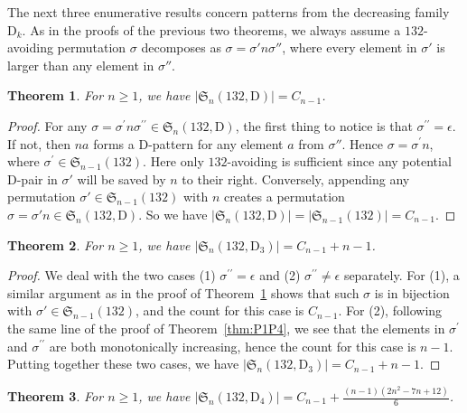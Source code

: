 \documentclass[12pt,reqno]{article}
\numberwithin{equation}{section}
\theoremstyle{plain}
\newtheorem{theorem}{Theorem}[section]
\theoremstyle{definition}
\def\fS{\mathfrak{S}}
\def\rD{\mathrm{D}}
\begin{document}
The next three enumerative results concern patterns from the decreasing family $\rD_k$. As in the proofs of the previous two theorems, we always assume a $132$-avoiding permutation $\sigma$ decomposes as $\sigma=\sigma'n\sigma''$, where every element in $\sigma'$ is larger than any element in $\sigma''$.

\begin{theorem}\label{thm:132D}
	For $n\geq 1$, we have $|\fS_n(132, \rD)|=C_{n-1}$. 
\end{theorem}

\begin{proof}
	For any $\sigma=\sigma^{\prime}n\sigma^{\prime \prime}\in \fS_n(132, \rD)$, the first thing to notice is that $\sigma^{\prime \prime}=\epsilon$. If not, then $na$ forms a $\rD$-pattern for any element $a$ from $\sigma''$. Hence $\sigma=\sigma^{\prime}n$, where $\sigma^{\prime}\in\fS_{n-1}(132)$. Here only $132$-avoiding is sufficient since any potential $\rD$-pair in $\sigma'$ will be saved by $n$ to their right. Conversely, appending any permutation $\sigma'\in\fS_{n-1}(132)$ with $n$ creates a permutation $\sigma=\sigma'n\in\fS_n(132,\rD)$. So we have $|\fS_n(132, \rD)|=|\fS_{n-1}(132)|=C_{n-1}$.
\end{proof}









\begin{theorem}\label{thm:132D3}
	For $n\geq 1$, we have $|\fS_n(132, \rD_3)|=C_{n-1}+n-1$. 
\end{theorem}

\begin{proof}
	We deal with the two cases (1) $\sigma^{\prime \prime}=\epsilon$ and (2) $\sigma^{\prime \prime}\neq\epsilon$ separately. For (1), a similar argument as in the proof of Theorem~\ref{thm:132D} shows that such $\sigma$ is in bijection with $\sigma'\in\fS_{n-1}(132)$, and the count for this case is $C_{n-1}$. For (2), following the same line of the proof of Theorem~\ref{thm:P1P4}, we see that the elements in $\sigma^{\prime}$ and $\sigma^{\prime \prime}$ are both monotonically increasing, hence the count for this case is $n-1$. Putting together these two cases, we have $|\fS_n(132, \rD_3)|=C_{n-1}+n-1$.
\end{proof}

\begin{theorem}\label{thm:132D4}
	For $n\geq 1$, we have $|\fS_n(132,\rD_4)|=C_{n-1}+\frac{\left(n-1\right)\left(2n^2-7n+12\right)}{6}$.
\end{theorem}
\end{document}
